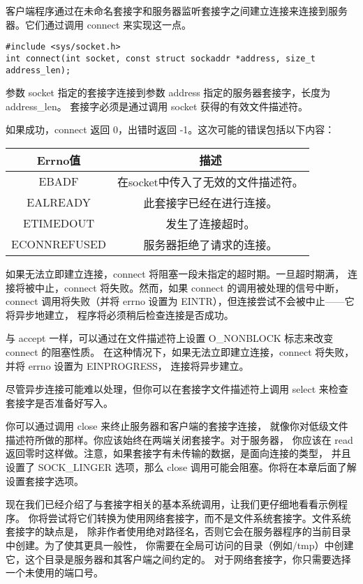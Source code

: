 \documentclass{ctexart}
\begin{document}
客户端程序通过在未命名套接字和服务器监听套接字之间建立连接来连接到服务器。它们通过调用 connect 来实现这一点。  
\begin{verbatim}  
#include <sys/socket.h>  
int connect(int socket, const struct sockaddr *address, size_t address_len);  
\end{verbatim}  
参数 socket 指定的套接字连接到参数 address 指定的服务器套接字，长度为 address\_len。
套接字必须是通过调用 socket 获得的有效文件描述符。  
  
如果成功，connect 返回 0，出错时返回 -1。这次可能的错误包括以下内容：  
\begin{center}  
\begin{tabular}{|c|c|}  
\hline  
Errno值 & 描述 \\  
\hline  
EBADF & 在socket中传入了无效的文件描述符。 \\  
\hline  
EALREADY & 此套接字已经在进行连接。 \\  
\hline  
ETIMEDOUT & 发生了连接超时。 \\  
\hline  
ECONNREFUSED & 服务器拒绝了请求的连接。 \\  
\hline  
\end{tabular}  
\end{center}  
  
如果无法立即建立连接，connect 将阻塞一段未指定的超时期。一旦超时期满，
连接将被中止，connect 将失败。然而，如果 connect 的调用被处理的信号中断，
connect 调用将失败（并将 errno 设置为 EINTR），但连接尝试不会被中止——它将异步地建立，
程序将必须稍后检查连接是否成功。  
  
与 accept 一样，可以通过在文件描述符上设置 O\_NONBLOCK 标志来改变 connect 的阻塞性质。
在这种情况下，如果无法立即建立连接，connect 将失败，并将 errno 设置为 EINPROGRESS，
连接将异步建立。  
  
尽管异步连接可能难以处理，但你可以在套接字文件描述符上调用 select 来检查套接字是否准备好写入。

你可以通过调用 close 来终止服务器和客户端的套接字连接，
就像你对低级文件描述符所做的那样。你应该始终在两端关闭套接字。对于服务器，
你应该在 read 返回零时这样做。注意，如果套接字有未传输的数据，是面向连接的类型，
并且设置了 SOCK\_LINGER 选项，那么 close 调用可能会阻塞。你将在本章后面了解设置套接字选项。  

现在我们已经介绍了与套接字相关的基本系统调用，让我们更仔细地看看示例程序。
你将尝试将它们转换为使用网络套接字，而不是文件系统套接字。文件系统套接字的缺点是，
除非作者使用绝对路径名，否则它会在服务器程序的当前目录中创建。为了使其更具一般性，
你需要在全局可访问的目录（例如/tmp）中创建它，这个目录是服务器和其客户端之间约定的。
对于网络套接字，你只需要选择一个未使用的端口号。  
  
\end{document}
